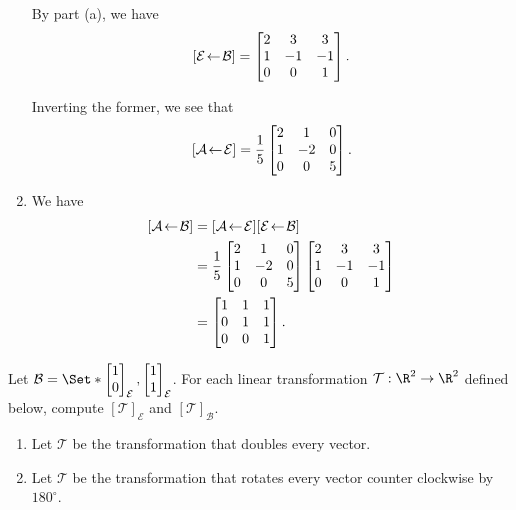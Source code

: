 \begin{exercises}
\begin{problist}
\begin{solution}
\begin{enumerate}
				By part (a), we have
				\[
					\BasisChange{\mathcal B}{\mathcal E}=
					\begin{bmatrix}
						2 & 3 & 3\\
						1 & -1 & -1\\
						0 & 0 & 1
					\end{bmatrix}.
				\]
				
				Inverting the former, we see that
				\[
					\BasisChange{\mathcal E}{\mathcal A}=\frac{1}{5}
					\begin{bmatrix}
						2 & 1 & 0\\
						1 & -2 & 0\\
						0 & 0 & 5
					\end{bmatrix}.
				\]
				\item We have
				\[
					\begin{aligned}
						\BasisChange{\mathcal B}{\mathcal A}
						&=\BasisChange{\mathcal E}{\mathcal A}\BasisChange{\mathcal B}{\mathcal E}\\
						&=\frac{1}{5}
						\begin{bmatrix}
							2 & 1 & 0\\
							1 & -2 & 0\\
							0 & 0 & 5
						\end{bmatrix}
						\begin{bmatrix}
							2 & 3 & 3\\
							1 & -1 & -1\\
							0 & 0 & 1
						\end{bmatrix}\\
						&=
						\begin{bmatrix}
							1 & 1 & 1\\
							0 & 1 & 1\\
							0 & 0 & 1
						\end{bmatrix}.
					\end{aligned}
				\]
			\end{enumerate}
		\end{solution}
		\prob Let $\mathcal B=\Set*{\mat{1\\0}_{\mathcal E},\mat{1\\1}_{\mathcal E}}$.
		For each linear transformation
		$\mathcal T:\R^{2}\to\R^{2}$ defined below, compute
		$[\mathcal T]_{\mathcal E}$ and $[\mathcal T]_{\mathcal B}$.
		\begin{enumerate}
			\item Let $\mathcal T$ be the transformation that doubles
				every vector.

			\item Let $\mathcal T$ be the transformation that rotates
				every vector counter clockwise by $180^{\circ}$.


\end{enumerate}
\end{problist}
\end{exercises}
